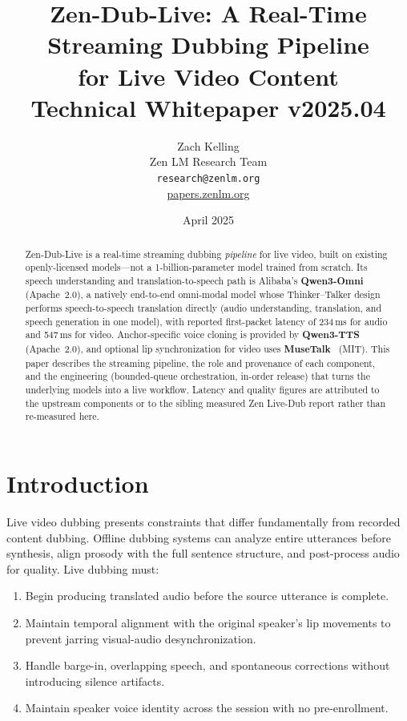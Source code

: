 \documentclass[11pt,a4paper]{article}
\title{\textbf{Zen-Dub-Live: A Real-Time Streaming Dubbing Pipeline\\
for Live Video Content}\\[0.5em]
\large Technical Whitepaper v2025.04}
\author{Zach Kelling \\ Zen LM Research Team\\
\texttt{research@zenlm.org}\\
\href{https://papers.zenlm.org}{papers.zenlm.org}}
\date{April 2025}
\begin{document}
\maketitle

\begin{abstract}
Zen-Dub-Live is a real-time streaming dubbing \emph{pipeline} for live video, built
on existing openly-licensed models---not a 1-billion-parameter model trained from
scratch. Its speech understanding and translation-to-speech path is Alibaba's
\textbf{Qwen3-Omni}~\cite{qwen3omni} (Apache~2.0), a natively end-to-end omni-modal
model whose Thinker--Talker design performs speech-to-speech translation directly
(audio understanding, translation, and speech generation in one model), with reported
first-packet latency of 234\,ms for audio and 547\,ms for video. Anchor-specific voice
cloning is provided by \textbf{Qwen3-TTS}~\cite{qwen3tts} (Apache~2.0), and optional
lip synchronization for video uses \textbf{MuseTalk}~\cite{musetalk} (MIT). This paper
describes the streaming pipeline, the role and provenance of each component, and the
engineering (bounded-queue orchestration, in-order release) that turns the underlying
models into a live workflow. Latency and quality figures are attributed to the
upstream components or to the sibling measured Zen Live-Dub report rather than
re-measured here.
\end{abstract}

\tableofcontents
\newpage

\section{Introduction}

Live video dubbing presents constraints that differ fundamentally from recorded content dubbing. Offline dubbing systems can analyze entire utterances before synthesis, align prosody with the full sentence structure, and post-process audio for quality. Live dubbing must:

\begin{enumerate}
  \item Begin producing translated audio before the source utterance is complete.
  \item Maintain temporal alignment with the original speaker's lip movements to prevent jarring visual-audio desynchronization.
  \item Handle barge-in, overlapping speech, and spontaneous corrections without introducing silence artifacts.
  \item Maintain speaker voice identity across the session with no pre-enrollment.
\end{enumerate}
\end{document}
